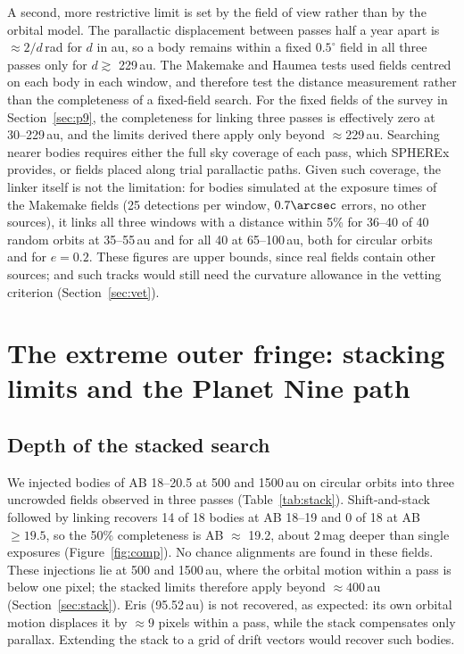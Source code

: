 \documentclass[twocolumn,linenumbers]{aastex702}
\begin{document}
A second, more restrictive limit is set by the field of view rather than by the orbital model. The parallactic displacement between passes half a year apart is $\approx 2/d$\,rad for $d$ in au, so a body remains within a fixed $0.5^\circ$ field in all three passes only for $d \gtrsim$ 229\,au. The Makemake and Haumea tests used fields centred on each body in each window, and therefore test the distance measurement rather than the completeness of a fixed-field search. For the fixed fields of the survey in Section~\ref{sec:p9}, the completeness for linking three passes is effectively zero at 30--229\,au, and the limits derived there apply only beyond $\approx$229\,au. Searching nearer bodies requires either the full sky coverage of each pass, which SPHEREx provides, or fields placed along trial parallactic paths. Given such coverage, the linker itself is not the limitation: for bodies simulated at the exposure times of the Makemake fields (25 detections per window, $0.7\arcsec$ errors, no other sources), it links all three windows with a distance within 5\% for 36--40 of 40 random orbits at 35--55\,au and for all 40 at 65--100\,au, both for circular orbits and for $e = 0.2$. These figures are upper bounds, since real fields contain other sources; and such tracks would still need the curvature allowance in the vetting criterion (Section~\ref{sec:vet}).

\section{The extreme outer fringe: stacking limits and the Planet Nine path}\label{sec:fringe}

\subsection{Depth of the stacked search}\label{sec:stackdepth}
We injected bodies of AB 18--20.5 at 500 and 1500\,au on circular orbits into three uncrowded fields observed in three passes (Table~\ref{tab:stack}). Shift-and-stack followed by linking recovers 14 of 18 bodies at AB 18--19 and 0 of 18 at AB $\ge 19.5$, so the 50\% completeness is AB $\approx$ 19.2, about 2\,mag deeper than single exposures (Figure~\ref{fig:comp}). No chance alignments are found in these fields. These injections lie at 500 and 1500\,au, where the orbital motion within a pass is below one pixel; the stacked limits therefore apply beyond $\approx 400$\,au (Section~\ref{sec:stack}). Eris (95.52\,au) is not recovered, as expected: its own orbital motion displaces it by $\approx 9$ pixels within a pass, while the stack compensates only parallax. Extending the stack to a grid of drift vectors would recover such bodies.
\end{document}
